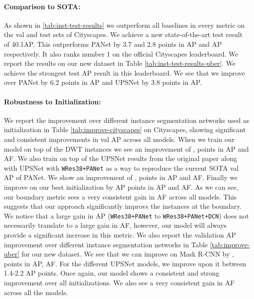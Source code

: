\documentclass[10pt,twocolumn,letterpaper]{article}
\begin{document}
\paragraph{Comparison to SOTA:}
As shown in \ref{tab:inst-test-results} we outperform all baselines in every metric  on the val and test sets of Cityscapes.  
We achieve a new state-of-the-art test result of 40.1AP. This  outperforms PANet by 3.7 and 2.8 points in AP and AP respectively. It also ranks number 1 on the official Cityscapes leaderboard. 
We report the results on our new dataset in Table \ref{tab:inst-test-results-uber}. We achieve the strongest test AP result in this leaderboard. We see that we improve over PANet by 6.2 points in AP and UPSNet by 3.8 points in AP. 

\vspace{-2mm}

\paragraph{Robustness to Initialization:}
We  report the improvement over different instance segmentation networks used as initialization in Table \ref{tab:improve-cityscapes} on Cityscapes, showing  significant and consistent improvements in val AP across all models. When we train our model on top of the DWT \cite{bai2017deep} instances we see an improvement of ,  points in AP and AF. We also train on top of the UPSNet results from the original paper along with UPSNet with \texttt{WRes38+PANet} as a way to reproduce the current SOTA val AP of PANet. We show an improvement of ,  points in AP and AF. Finally we  improve on our best initialization by  AP points in AP and AF. As we can see, our boundary metric sees a very consistent  gain in AF across all  models. This suggests that our approach  significantly improvs the instances at the boundary. We notice that a large gain in AP (\texttt{WRes38+PANet} to \texttt{WRes38+PANet+DCN}) does not necessarily translate to a large gain in AF, however, our model will always provide a significant increase in this metric.
We also report the validation AP improvement over different instance segmentation networks in Table \ref{tab:improve-uber} for our new dataset. We see that we can improve on Mask R-CNN \cite{mask-rcnn} by ,  points in AP, AF. For the different UPSNet models, we improve upon it between 1.4-2.2 AP points. Once again, our model shows a consistent and strong improvement over all initializations. We also see a very consistent  gain in AF across all the models. 
\end{document}
